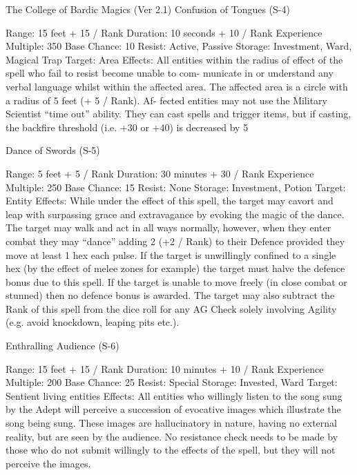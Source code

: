 \begin{Chapter}{The College of Bardic Magics (Ver 2.1)}
Confusion of Tongues (S-4) 

Range: 15 feet + 15 / Rank 
Duration: 10 seconds + 10 / Rank 
Experience Multiple: 350 
Base Chance: 10%
Resist: Active, Passive 
Storage: Investment, Ward, Magical Trap 
Target: Area 
Effects:  All  entities  within  the  radius  of  effect  of 
the spell  who fail to  resist become unable to com-
municate  in  or  understand  any  verbal  language 
whilst within the affected area. The affected area is 
a  circle  with  a  radius  of  5  feet  (+  5  /  Rank).  Af-
fected  entities  may  not  use  the  Military  Scientist 
“time out” ability. They can cast spells and trigger 
items,  but  if  casting,  the  backfire  threshold  (i.e. 
+30 or +40) is decreased by 5%

Dance of Swords (S-5) 

Range: 5 feet + 5 / Rank 
Duration: 30 minutes + 30 / Rank 
Experience Multiple: 250 
Base Chance: 15%
Resist: None 
Storage: Investment, Potion 
Target: Entity 
Effects:  While  under  the  effect  of  this  spell,  the 
target  may  cavort  and  leap  with  surpassing  grace 
and  extravagance  by  evoking  the  magic  of  the 
dance.  The  target  may  walk  and  act  in  all  ways 
normally,  however,  when  they  enter  combat  they 
may “dance” adding 2 (+2 / Rank) to their Defence 
provided they move at least 1 hex each pulse. If the 
target  is  unwillingly  confined  to  a  single  hex  (by 
the  effect  of  melee  zones  for  example)  the  target 
must  halve  the  defence  bonus  due  to  this  spell.  If 
the target is unable to move freely (in close combat 
or stunned) then no defence bonus is awarded. The 
target may also subtract the Rank of this spell from 
the  dice  roll  for  any  AG  Check  solely  involving 
Agility (e.g. avoid knockdown, leaping pits etc.). 

Enthralling Audience (S-6) 

Range: 15 feet + 15 / Rank 
Duration: 10 minutes + 10 / Rank 
Experience Multiple: 200 
Base Chance: 25%
Resist: Special 
Storage: Invested, Ward 
Target: Sentient living entities 
Effects: All entities who willingly listen to the song 
sung  by  the  Adept  will  perceive  a  succession  of 
evocative  images  which  illustrate  the  song  being 
sung.  These  images  are  hallucinatory  in  nature, 
having  no  external  reality,  but  are  seen  by  the 
audience. No resistance check needs to be made by 
those who do not submit willingly to the effects of 
the  spell,  but  they  will  not  perceive  the  images. 


\end{Chapter}
